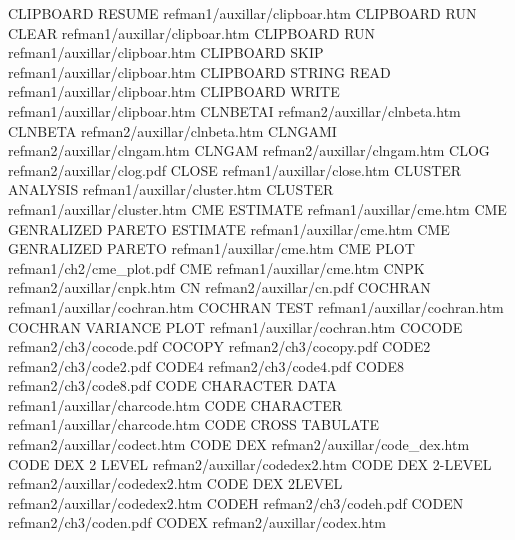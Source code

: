 CLIPBOARD RESUME                        refman1/auxillar/clipboar.htm
CLIPBOARD RUN CLEAR                     refman1/auxillar/clipboar.htm
CLIPBOARD RUN                           refman1/auxillar/clipboar.htm
CLIPBOARD SKIP                          refman1/auxillar/clipboar.htm
CLIPBOARD STRING READ                   refman1/auxillar/clipboar.htm
CLIPBOARD WRITE                         refman1/auxillar/clipboar.htm
CLNBETAI                                refman2/auxillar/clnbeta.htm
CLNBETA                                 refman2/auxillar/clnbeta.htm
CLNGAMI                                 refman2/auxillar/clngam.htm
CLNGAM                                  refman2/auxillar/clngam.htm
CLOG                                    refman2/auxillar/clog.pdf
CLOSE                                   refman1/auxillar/close.htm
CLUSTER ANALYSIS                        refman1/auxillar/cluster.htm
CLUSTER                                 refman1/auxillar/cluster.htm
CME ESTIMATE                            refman1/auxillar/cme.htm
CME GENRALIZED PARETO ESTIMATE          refman1/auxillar/cme.htm
CME GENRALIZED PARETO                   refman1/auxillar/cme.htm
CME PLOT                                refman1/ch2/cme_plot.pdf
CME                                     refman1/auxillar/cme.htm
CNPK                                    refman2/auxillar/cnpk.htm
CN                                      refman2/auxillar/cn.pdf
COCHRAN                                 refman1/auxillar/cochran.htm
COCHRAN TEST                            refman1/auxillar/cochran.htm
COCHRAN VARIANCE PLOT                   refman1/auxillar/cochran.htm
COCODE                                  refman2/ch3/cocode.pdf
COCOPY                                  refman2/ch3/cocopy.pdf
CODE2                                   refman2/ch3/code2.pdf
CODE4                                   refman2/ch3/code4.pdf
CODE8                                   refman2/ch3/code8.pdf
CODE CHARACTER DATA                     refman1/auxillar/charcode.htm
CODE CHARACTER                          refman1/auxillar/charcode.htm
CODE CROSS TABULATE                     refman2/auxillar/codect.htm
CODE DEX                                refman2/auxillar/code_dex.htm
CODE DEX 2 LEVEL                        refman2/auxillar/codedex2.htm
CODE DEX 2-LEVEL                        refman2/auxillar/codedex2.htm
CODE DEX 2LEVEL                         refman2/auxillar/codedex2.htm
CODEH                                   refman2/ch3/codeh.pdf
CODEN                                   refman2/ch3/coden.pdf
CODEX                                   refman2/auxillar/codex.htm
